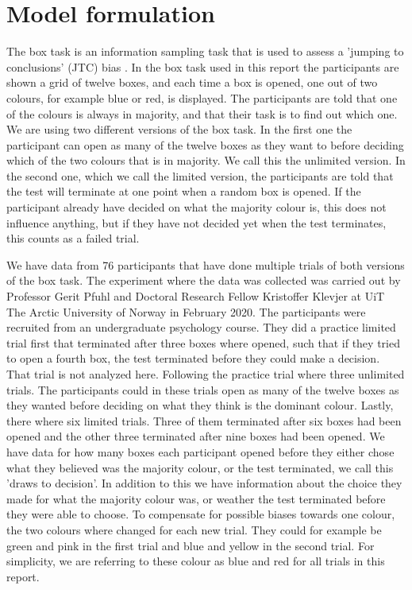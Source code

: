 \newpage
\chapter{Model formulation}
\label{Chapter_Problem_setup}
The box task is an information sampling task that is used to assess a 'jumping to conclusions' (JTC) bias \citep{balzan2017}. In the box task used in this report the participants are shown a grid of twelve boxes, and each time a box is opened, one out of two colours, for example blue or red, is displayed. The participants are told that one of the colours is always in majority, and that their task is to find out which one. We are using two different versions of the box task. In the first one the participant can open as many of the twelve boxes as they want to before deciding which of the two colours that is in majority. We call this the unlimited version. In the second one, which we call the limited version, the participants are told that the test will terminate at one point when a random box is opened. If the participant already have decided on what the majority colour is, this does not influence anything, but if they have not decided yet when the test terminates, this counts as a failed trial. 

We have data from 76 participants that have done multiple trials of both versions of the box task. The experiment where the data was collected was carried out by Professor Gerit Pfuhl and Doctoral Research Fellow Kristoffer Klevjer at UiT The Arctic University of Norway in February 2020. The participants were recruited from an undergraduate psychology course. They did a practice limited trial first that terminated after three boxes where opened, such that if they tried to open a fourth box, the test terminated before they could make a decision. That trial is not analyzed here. Following the practice trial where three unlimited trials. The participants could in these trials open as many of the twelve boxes as they wanted before deciding on what they think is the dominant colour. Lastly, there where six limited trials. Three of them terminated after six boxes had been opened and the other three terminated after nine boxes had been opened. We have data for how many boxes each participant opened before they either chose what they believed was the majority colour, or the test terminated, we call this 'draws to decision'. In addition to this we have information about the choice they made for what the majority colour was, or weather the test terminated before they were able to choose. To compensate for possible biases towards one colour, the two colours where changed for each new trial. They could for example be green and pink in the first trial and blue and yellow in the second trial. For simplicity, we are referring to these colour as blue and red for all trials in this report.

